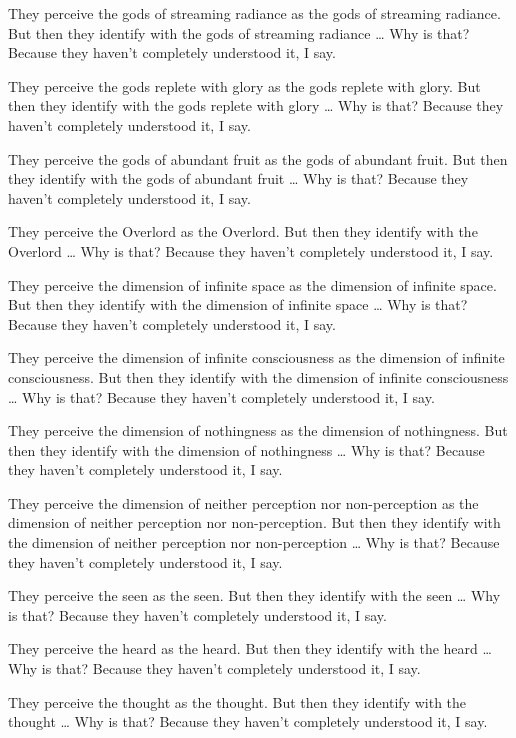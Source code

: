 \documentclass[12pt,openany]{book}%
\begin{document}
They perceive the gods of streaming radiance as the gods of streaming radiance. But then they identify with the gods of streaming radiance … Why is that? Because they haven’t completely understood it, I say. 

They perceive the gods replete with glory as the gods replete with glory. But then they identify with the gods replete with glory … Why is that? Because they haven’t completely understood it, I say. 

They perceive the gods of abundant fruit as the gods of abundant fruit. But then they identify with the gods of abundant fruit … Why is that? Because they haven’t completely understood it, I say. 

They perceive the Overlord as the Overlord. But then they identify with the Overlord … Why is that? Because they haven’t completely understood it, I say. 

They perceive the dimension of infinite space as the dimension of infinite space. But then they identify with the dimension of infinite space … Why is that? Because they haven’t completely understood it, I say. 

They perceive the dimension of infinite consciousness as the dimension of infinite consciousness. But then they identify with the dimension of infinite consciousness … Why is that? Because they haven’t completely understood it, I say. 

They perceive the dimension of nothingness as the dimension of nothingness. But then they identify with the dimension of nothingness … Why is that? Because they haven’t completely understood it, I say. 

They perceive the dimension of neither perception nor non-perception as the dimension of neither perception nor non-perception. But then they identify with the dimension of neither perception nor non-perception … Why is that? Because they haven’t completely understood it, I say. 

They perceive the seen as the seen. But then they identify with the seen … Why is that? Because they haven’t completely understood it, I say. 

They perceive the heard as the heard. But then they identify with the heard … Why is that? Because they haven’t completely understood it, I say. 

They perceive the thought as the thought. But then they identify with the thought … Why is that? Because they haven’t completely understood it, I say. 
\end{document}
